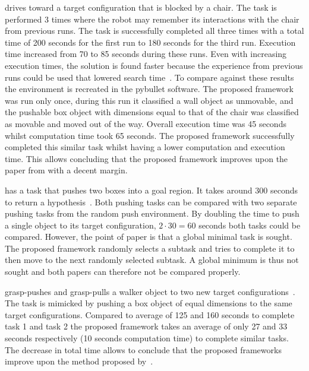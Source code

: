 \citeauthor{wang_affordancebased_2020} drives toward a target configuration that is blocked by a chair. The task is performed 3 times where the robot may remember its interactions with the chair from previous runs. The task is successfully completed all three times with a total time of 200 seconds for the first run to 180 seconds for the third run. Execution time increased from 70 to 85 seconds during these runs. Even with increasing execution times, the solution is found faster because the experience from previous runs could be used that lowered search time~\cite{wang_affordancebased_2020}. To compare against these results the environment is recreated in the pybullet software. The proposed framework was run only once, during this run it classified a wall object as unmovable, and the pushable box object with dimensions equal to that of the chair was classified as movable and moved out of the way. Overall execution time was 45 seconds whilst computation time took 65 seconds. The proposed framework successfully completed this similar task whilst having a lower computation and execution time. This allows concluding that the proposed framework improves upon the paper from \citeauthor{wang_affordancebased_2020} with a decent margin.\bs

\citeauthor{vega-brown_asymptotically_2020} has a task that pushes two boxes into a goal region. It takes around 300 seconds to return a hypothesis~\cite{vega-brown_asymptotically_2020}. Both pushing tasks can be compared with two separate pushing tasks from the random push environment. By doubling the time to push a single object to its target configuration, $2 \cdot 30 = 60$ seconds both tasks could be compared. However, the point of \citeauthor{vega-brown_asymptotically_2020} paper is that a global minimal task is sought. The proposed framework randomly selects a subtask and tries to complete it to then move to the next randomly selected subtask. A global minimum is thus not sought and both papers can therefore not be compared properly.\bs

\citeauthor{sabbaghnovin_model_2021} grasp-pushes and grasp-pulls a walker object to two new target configurations~\cite{sabbaghnovin_model_2021}. The task is mimicked by pushing a box object of equal dimensions to the same target configurations. Compared to \citeauthor{sabbaghnovin_model_2021} average of 125 and 160 seconds to complete task 1 and task 2 the proposed framework takes an average of only 27 and 33 seconds respectively (10 seconds computation time) to complete similar tasks. The decrease in total time allows to conclude that the proposed frameworks improve upon the method proposed by~\citeauthor{sabbaghnovin_model_2021}.\bs

